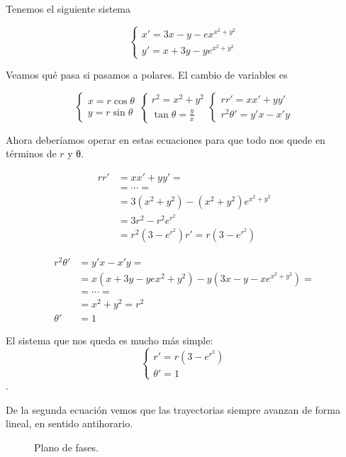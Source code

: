 \begin{example}
Tenemos el siguiente sistema

\[ \begin{cases} x' = 3x - y - ex^{x^2+y^2} \\ 
y' = x+ 3y -ye^{x^2+y^2} \end{cases} \]

Veamos qué pasa si pasamos a polares. El cambio de variables es

\[ \begin{cases} x = r\cos θ \\ y = r \sin θ \end{cases} 
\begin{cases} r^2 = x^2+y^2 \\ \tan θ = \frac{y}{x} \end{cases}
\begin{cases} rr' = xx' + yy' \\ r^2θ' = y'x - x' y \end{cases} \]

Ahora deberíamos operar en estas ecuaciones para que todo nos quede en términos de $r$ y θ.

\begin{align*}
 rr' &= xx' + yy' = \\
 &= \cdots = \\
 &= 3(x^2+y^2) - (x^2+y^2)e^{x^2+y^2} \\
 &= 3r^2 - r^2e^{r^2} \\ 
 &= r^2(3-e^{r^2}) 
r' = r(3-e^{r^2}) 
\end{align*}

\begin{align*}
r^2θ' &= y'x - x'y =\\
 &= x(x+3y-ye{x^2+y^2}) -y(3x-y-xe^{x^2+y^2}) = \\
 &= \cdots = \\
 &= x^2 + y^2 = r^2 \\
θ' &= 1
\end{align*}

El sistema que nos queda es mucho más simple: \[ \begin{cases} r' = r(3-e^{r^2}) \\ θ' = 1 \end{cases} \].

De la segunda ecuación vemos que las trayectorias siempre avanzan de forma lineal, en sentido antihorario.

\begin{figure}
\label{img8-Ej4}
\caption{Plano de fases.}
\end{figure}



\end{example}
